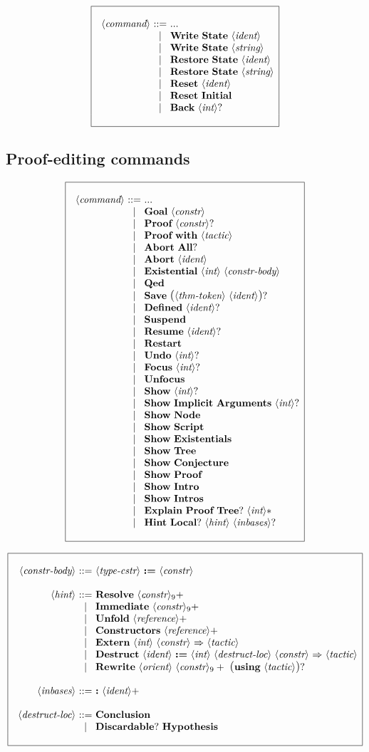 \documentclass{article}
\makeatletter
\def\GR#1{\text{\large(}#1\text{\large)}}
\def\NT#1{\langle\textit{#1}\rangle}
\def\NTL#1#2{\langle\textit{#1}\rangle_{#2}}
\def\TERM#1{{\bf\textrm{\bf #1}}}
\def\KWD#1{\TERM{#1}}
\def\STAR#1{#1*}
\def\PLUS#1{#1+}
\def\OPT#1{#1?}
\def\OPTGR#1{\GR{#1}?}
\newenvironment{cadre}
        {\begin{array}{|c|}\hline\\}
        {\\\\\hline\end{array}}
\newenvironment{rulebox}
        {$$\begin{cadre}\begin{array}{r@{~}c@{~}l@{}l@{}r}}
        {\end{array}\end{cadre}$$}
\def\DEFNT#1{\NT{#1} & ::= &}
\def\EXTNT#1{\NT{#1} & ::= & ... \\&|&}
\def\SEPDEF{\\\\}
\def\nlsep{\\&|&}
\newenvironment{rules}
        {\begin{center}\begin{rulebox}}
        {\end{rulebox}\end{center}}
\makeatother
\begin{document}
\begin{rules}
\EXTNT{command}
       \TERM{Write}~\TERM{State}~\NT{ident}
\nlsep \TERM{Write}~\TERM{State}~\NT{string}
\nlsep \TERM{Restore}~\TERM{State}~\NT{ident}
\nlsep \TERM{Restore}~\TERM{State}~\NT{string}
\nlsep \TERM{Reset}~\NT{ident}
\nlsep \TERM{Reset}~\TERM{Initial}
\nlsep \TERM{Back}~\OPT{\NT{int}}
\end{rules}

\subsection{Proof-editing commands}

\begin{rules}
\EXTNT{command}
       \TERM{Goal}~\NT{constr}
\nlsep \TERM{Proof}~\OPT{\NT{constr}}
\nlsep \TERM{Proof}~\KWD{with}~\NT{tactic}
\nlsep \TERM{Abort}~\OPT{\TERM{All}}
\nlsep \TERM{Abort}~\NT{ident}
\nlsep \TERM{Existential}~\NT{int}~\NT{constr-body}
\nlsep \TERM{Qed}
\nlsep \TERM{Save}~\OPTGR{\NT{thm-token}~\NT{ident}}
\nlsep \TERM{Defined}~\OPT{\NT{ident}}
\nlsep \TERM{Suspend}
\nlsep \TERM{Resume}~\OPT{\NT{ident}}
\nlsep \TERM{Restart}
\nlsep \TERM{Undo}~\OPT{\NT{int}}
\nlsep \TERM{Focus}~\OPT{\NT{int}}
\nlsep \TERM{Unfocus}
\nlsep \TERM{Show}~\OPT{\NT{int}}
\nlsep \TERM{Show}~\TERM{Implicit}~\TERM{Arguments}~\OPT{\NT{int}}
\nlsep \TERM{Show}~\TERM{Node}
\nlsep \TERM{Show}~\TERM{Script}
\nlsep \TERM{Show}~\TERM{Existentials}
\nlsep \TERM{Show}~\TERM{Tree}
\nlsep \TERM{Show}~\TERM{Conjecture}
\nlsep \TERM{Show}~\TERM{Proof}
\nlsep \TERM{Show}~\TERM{Intro}
\nlsep \TERM{Show}~\TERM{Intros}
\nlsep \TERM{Explain}~\TERM{Proof}~\OPT{\TERM{Tree}}~\STAR{\NT{int}}
\nlsep \TERM{Hint}~\OPT{\TERM{Local}}~\NT{hint}~\OPT{\NT{inbases}}
\end{rules}


\begin{rules}
\DEFNT{constr-body}
       \NT{type-cstr}~\KWD{:=}~\NT{constr}
\SEPDEF
\DEFNT{hint}
       \TERM{Resolve}~\PLUS{\NTL{constr}{9}}
\nlsep \TERM{Immediate}~\PLUS{\NTL{constr}{9}}
\nlsep \TERM{Unfold}~\PLUS{\NT{reference}}
\nlsep \TERM{Constructors}~\PLUS{\NT{reference}}
\nlsep \TERM{Extern}~\NT{int}~\NT{constr}~\KWD{$\Rightarrow$}~\NT{tactic}
\nlsep \TERM{Destruct}~\NT{ident}~\KWD{:=}~\NT{int}~\NT{destruct-loc}
       ~\NT{constr}~\KWD{$\Rightarrow$}~\NT{tactic}
\nlsep \TERM{Rewrite}~\NT{orient}~\PLUS{\NTL{constr}{9}}
       ~\OPTGR{\KWD{using}~\NT{tactic}}
\SEPDEF
\DEFNT{inbases}
       \KWD{:}~\PLUS{\NT{ident}}
\SEPDEF
\DEFNT{destruct-loc}
       \TERM{Conclusion}
\nlsep \OPT{\TERM{Discardable}}~\TERM{Hypothesis}
\end{rules}
\end{document}
